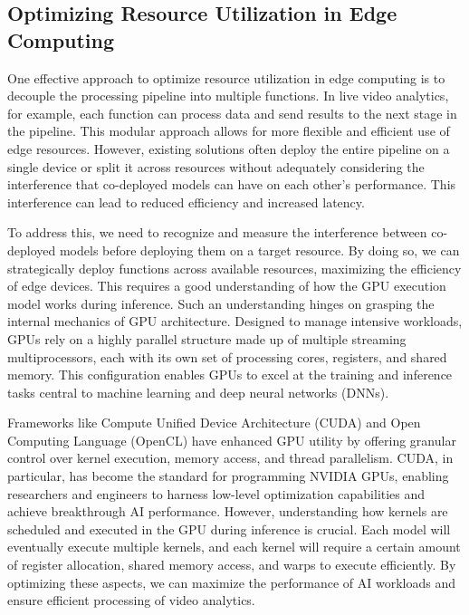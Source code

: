 \subsection{Optimizing Resource Utilization in Edge Computing}

One effective approach to optimize resource utilization in edge computing is to decouple the processing pipeline into multiple functions. In live video analytics, for example, each function can process data and send results to the next stage in the pipeline. This modular approach allows for more flexible and efficient use of edge resources. However, existing solutions often deploy the entire pipeline on a single device or split it across resources without adequately considering the interference that co-deployed models can have on each other's performance. This interference can lead to reduced efficiency and increased latency.

To address this, we need to recognize and measure the interference between co-deployed models before deploying them on a target resource. By doing so, we can strategically deploy functions across available resources, maximizing the efficiency of edge devices. This requires a good understanding of how the GPU execution model works during inference. Such an understanding hinges on grasping the internal mechanics of GPU architecture. Designed to manage intensive workloads, GPUs rely on a highly parallel structure made up of multiple streaming multiprocessors, each with its own set of processing cores, registers, and shared memory. This configuration enables GPUs to excel at the training and inference tasks central to machine learning and deep neural networks (DNNs).

Frameworks like Compute Unified Device Architecture (CUDA) and Open Computing Language (OpenCL) have enhanced GPU utility by offering granular control over kernel execution, memory access, and thread parallelism. CUDA, in particular, has become the standard for programming NVIDIA GPUs, enabling researchers and engineers to harness low-level optimization capabilities and achieve breakthrough AI performance. However, understanding how kernels are scheduled and executed in the GPU during inference is crucial. Each model will eventually execute multiple kernels, and each kernel will require a certain amount of register allocation, shared memory access, and warps to execute efficiently. By optimizing these aspects, we can maximize the performance of AI workloads and ensure efficient processing of video analytics.

